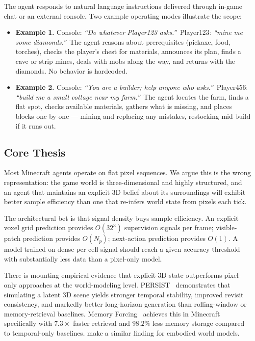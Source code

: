 \documentclass[11pt,a4paper]{article}
\begin{document}
The agent responds to natural language instructions delivered through in-game chat or an external console. Two example operating modes illustrate the scope:

\begin{itemize}
  \item \textbf{Example 1.} Console: \textit{``Do whatever Player123 asks.''}\ Player123: \textit{``mine me some diamonds.''}\ The agent reasons about prerequisites (pickaxe, food, torches), checks the player's chest for materials, announces its plan, finds a cave or strip mines, deals with mobs along the way, and returns with the diamonds. No behavior is hardcoded.

  \item \textbf{Example 2.} Console: \textit{``You are a builder; help anyone who asks.''}\ Player456: \textit{``build me a small cottage near my farm.''}\ The agent locates the farm, finds a flat spot, checks available materials, gathers what is missing, and places blocks one by one --- mining and replacing any mistakes, restocking mid-build if it runs out.
\end{itemize}

\subsection{Core Thesis}

Most Minecraft agents operate on flat pixel sequences. We argue this is the wrong representation: the game world is three-dimensional and highly structured, and an agent that maintains an explicit 3D belief about its surroundings will exhibit better sample efficiency than one that re-infers world state from pixels each tick.

The architectural bet is that signal density buys sample efficiency. An explicit voxel grid prediction provides $O(32^3)$ supervision signals per frame; visible-patch prediction provides $O(N_p)$; next-action prediction provides $O(1)$. A model trained on dense per-cell signal should reach a given accuracy threshold with substantially less data than a pixel-only model.

There is mounting empirical evidence that explicit 3D state outperforms pixel-only approaches at the world-modeling level. PERSIST~\cite{persist} demonstrates that simulating a latent 3D scene yields stronger temporal stability, improved revisit consistency, and markedly better long-horizon generation than rolling-window or memory-retrieval baselines. Memory Forcing~\cite{memforcing} achieves this in Minecraft specifically with $7.3\times$ faster retrieval and $98.2\%$ less memory storage compared to temporal-only baselines. \citet{zhou3d} make a similar finding for embodied world models.
\end{document}
